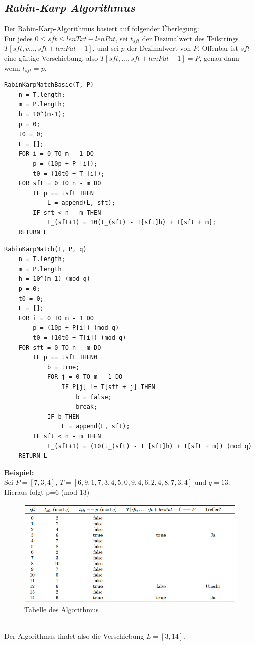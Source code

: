 \documentclass{article}
\begin{document}
        \subsection{\textit{Rabin-Karp Algorithmus}}
            Der Rabin-Karp-Algorithmus basiert auf folgender Überlegung: \\
            Für jedes $0 \leq sft \leq lenTxt - lenPat$, sei $t_{sft}$ der Dezimalwert des Teilstrings $T[sft,v..., sft + lenPat - 1]$, und sei $p$ der Dezimalwert von $P$. Offenbar ist $sft$ eine gültige Verschiebung, also $T[sft, ..., sft + lenPat - 1] = P$, genau dann wenn $t_{sft}= p$.
            \begin{lstlisting}[style=pseudocode]
RabinKarpMatchBasic(T, P)
    n = T.length; 
    m = P.length;
    h = 10^(m-1);
    p = 0;
    t0 = 0;
    L = [];
    FOR i = 0 TO m - 1 DO
        p = (10p + P [i]);
        t0 = (10t0 + T [i]);
    FOR sft = 0 TO n - m DO
        IF p == tsft THEN
            L = append(L, sft);
        IF sft < n - m THEN
            t_(sft+1) = 10(t_(sft) - T[sft]h) + T[sft + m];
    RETURN L
            \end{lstlisting}
            \begin{lstlisting}[style=pseudocode]
RabinKarpMatch(T, P, q)
    n = T.length;
    m = P.length
    h = 10^(m-1) (mod q)
    p = 0;
    t0 = 0;
    L = [];
    FOR i = 0 TO m - 1 DO
        p = (10p + P[i]) (mod q)
        t0 = (10t0 + T[i]) (mod q)
    FOR sft = 0 TO n - m DO
        IF p == tsft THEN0
            b = true;
            FOR j = 0 TO m - 1 DO
                IF P[j] != T[sft + j] THEN
                    b = false;
                    break;
            IF b THEN
                L = append(L, sft);
        IF sft < n - m THEN
            t_(sft+1) = (10(t_(sft) - T [sft]h) + T[sft + m]) (mod q)
    RETURN L
            \end{lstlisting}
            \textbf{Beispiel:}\\
            Sei $P=[7,3,4]$, $T=[6,9,1,7,3,4,5,0,9,4,6,2,4,8,7,3,4]$ und $q=13$. \\
            Hieraus folgt p=6 (mod 13)\\
            \begin{figure}[ht]
                \centering
                \includegraphics[width=1\textwidth]{Bilder/RKAlg.png}
                \caption{Tabelle des Algorithmus}
                \label{fig:RKAlg}
            \end{figure}\\
            Der Algorithmus findet also die Verschiebung $L=[3,14]$.
\end{document}
